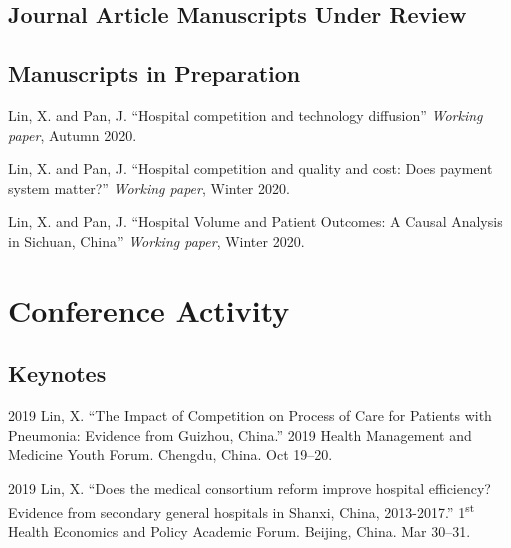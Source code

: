 \documentclass[12pt,letterpaper]{report}
\begin{document}
    \subsection*{Journal Article Manuscripts Under Review}



    \subsection*{Manuscripts in Preparation}

    \begin{tablist}
        
		\item[\the\year] \tab Lin, X. and Pan, J. \enquote{Hospital competition and technology diffusion} \textit{Working paper}, Autumn 2020.
		
		\item[\the\year] \tab Lin, X. and Pan, J. \enquote{Hospital competition and quality and cost: Does payment system matter?}  \textit{Working paper}, Winter 2020.
		
		\item[\the\year] \tab Lin, X. and Pan, J. \enquote{Hospital Volume and Patient Outcomes: A Causal Analysis in Sichuan, China}  \textit{Working paper}, Winter 2020.
		
     \end{tablist}

    \section*{Conference Activity}

    \subsection*{Keynotes}

    \begin{tablist}
    
    	 \item[2019] \tab Lin, X. \enquote{The Impact of Competition on Process of Care for Patients with Pneumonia: Evidence from Guizhou, China.}  2019 Health Management and Medicine Youth Forum. Chengdu, China. Oct 19--20.
		        
        \item[2019] \tab Lin, X. \enquote{Does the medical consortium reform improve hospital efficiency? Evidence from secondary general hospitals in Shanxi, China, 2013-2017.}  1\textsuperscript{st} Health Economics and Policy Academic Forum. Beijing, China. Mar 30--31.
		
    \end{tablist}
    
\end{document}
